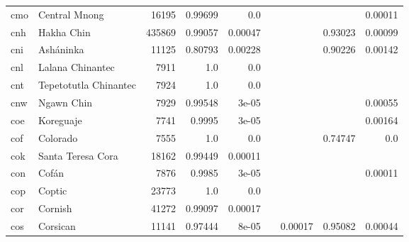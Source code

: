 \documentclass[11pt]{article}
\begin{document}
\begin{table*}[h]
{\begin{tabular}{llrrrrrrr}
cmo         & Central Mnong         & 16195         & 0.99699         & 0.0         &          &          &          & 0.00011         \\

cnh         & Hakha Chin         & 435869         & 0.99057         & 0.00047         &          &          & 0.93023         & 0.00099         \\

cni         & Asháninka         & 11125         & 0.80793         & 0.00228         &          &          & 0.90226         & 0.00142         \\

cnl         & Lalana Chinantec         & 7911         & 1.0         & 0.0         &          &          &          &          \\

cnt         & Tepetotutla Chinantec         & 7924         & 1.0         & 0.0         &          &          &          &          \\

cnw         & Ngawn Chin         & 7929         & 0.99548         & 3e-05         &          &          &          & 0.00055         \\

coe         & Koreguaje         & 7741         & 0.9995         & 3e-05         &          &          &          & 0.00164         \\

cof         & Colorado         & 7555         & 1.0         & 0.0         &          &          & 0.74747         & 0.0         \\

cok         & Santa Teresa Cora         & 18162         & 0.99449         & 0.00011         &          &          &          &          \\

con         & Cofán         & 7876         & 0.9985         & 3e-05         &          &          &          & 0.00011         \\

cop         & Coptic         & 23773         & 1.0         & 0.0         &          &          &          &          \\

cor         & Cornish         & 41272         & 0.99097         & 0.00017         &          &          &          &          \\

cos         & Corsican         & 11141         & 0.97444         & 8e-05         &          & 0.00017         & 0.95082         & 0.00044         \\


\end{tabular}}
\end{table*}
\end{document}
